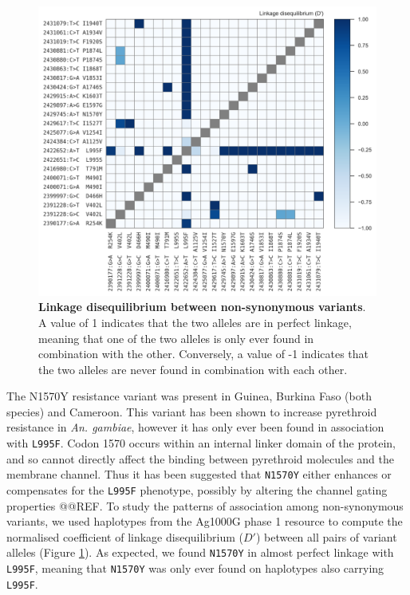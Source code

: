 \documentclass[a4paper,11pt,abstracton,hidelinks]{scrartcl}
\begin{document}
%
\begin{figure}[!t]

  \centering
  
  \includegraphics[width=\linewidth]{artwork/fig_ld.png}
  
  \caption{\textbf{Linkage disequilibrium between non-synonymous variants}. A value of 1 indicates that the two alleles are in perfect linkage, meaning that one of the two alleles is only ever found in combination with the other. Conversely, a value of -1 indicates that the two alleles are never found in combination with each other.}
  
  \label{fig:ld}
 
\end{figure}


%
The N1570Y resistance variant was present in Guinea, Burkina Faso (both species) and Cameroon.
%
This variant has been shown to increase pyrethroid resistance in \textit{An. gambiae}, however it has only ever been found in association with \texttt{L995F}.
%
Codon 1570 occurs within an internal linker domain of the protein, and so cannot directly affect the binding between pyrethroid molecules and the membrane channel.
%
Thus it has been suggested that \texttt{N1570Y} either enhances or compensates for the \texttt{L995F} phenotype, possibly by altering the channel gating properties @@REF.
%
To study the patterns of association among non-synonymous variants, we used haplotypes from the Ag1000G phase 1 resource to compute the normalised coefficient of linkage disequilibrium ($D'$) between all pairs of variant alleles (Figure \ref{fig:ld}).
%
As expected, we found \texttt{N1570Y} in almost perfect linkage with \texttt{L995F}, meaning that \texttt{N1570Y} was only ever found on haplotypes also carrying \texttt{L995F}.
\end{document}
